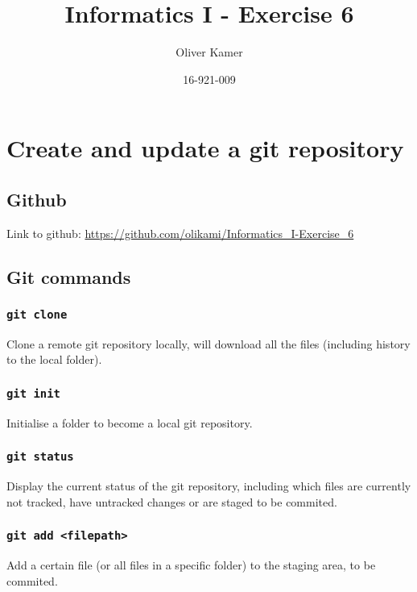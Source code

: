 \documentclass[12pt,a4paper]{article}
\author{Oliver Kamer}
\title{Informatics I - Exercise 6}
\date{16-921-009}
\begin{document}
	\maketitle

	\tableofcontents
	
	\section{Create and update a git repository}
	
		\subsection{Github}
		
			Link to github: \url{https://github.com/olikami/Informatics_I-Exercise_6}
		
		\subsection{Git commands}
		
			\subsubsection{\texttt{git clone}}
			
				Clone a remote git repository locally, will download all the files (including history to the local folder).
			
			\subsubsection{\texttt{git init}}
			
				Initialise a folder to become a local git repository.
			
			\subsubsection{\texttt{git status}}
			
				Display the current status of the git repository, including which files are currently not tracked, have untracked changes or are staged to be commited.
			
			\subsubsection{\texttt{git add <filepath>}}
			
				Add a certain file (or all files in a specific folder) to the staging area, to be commited.
			
\end{document}
